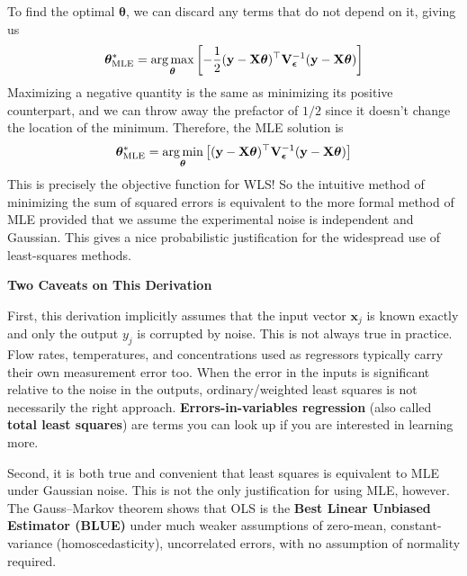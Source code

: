To find the optimal $\boldsymbol{\theta}$, we can discard any terms that do not depend on it, giving us
\begin{equation}
    \boldsymbol{\theta}_{\text{MLE}}^* = \operatorname*{arg\,max}_{\boldsymbol{\theta}} \left[ -\frac{1}{2}(\mathbf{y} - \mathbf{X}\boldsymbol{\theta})^\top \mathbf{V}_{\boldsymbol{\epsilon}}^{-1}(\mathbf{y} - \mathbf{X}\boldsymbol{\theta}) \right]
\end{equation}
Maximizing a negative quantity is the same as minimizing its positive counterpart, and we can throw away the prefactor of $1/2$ since it doesn't change the location of the minimum. Therefore, the MLE solution is
\begin{equation}
    \boldsymbol{\theta}_{\text{MLE}}^* = \operatorname*{arg\,min}_{\boldsymbol{\theta}} \left[ (\mathbf{y} - \mathbf{X}\boldsymbol{\theta})^\top \mathbf{V}_{\boldsymbol{\epsilon}}^{-1}(\mathbf{y} - \mathbf{X}\boldsymbol{\theta}) \right]
\end{equation}
This is precisely the objective function for WLS! So the intuitive method of minimizing the sum of squared errors is equivalent to the more formal method of MLE provided that we assume the experimental noise is independent and Gaussian. This gives a nice probabilistic justification for the widespread use of least-squares methods.

\begin{warningBox}
\textbf{Two Caveats on This Derivation}

First, this derivation implicitly assumes that the input vector $\mathbf{x}_j$ is known exactly and only the output $y_j$ is corrupted by noise. This is not always true in practice. Flow rates, temperatures, and concentrations used as regressors typically carry their own measurement error too. When the error in the inputs is significant relative to the noise in the outputs, ordinary/weighted least squares is not necessarily the right approach. \textbf{Errors-in-variables regression} (also called \textbf{total least squares}) are terms you can look up if you are interested in learning more.

Second, it is both true and convenient that least squares is equivalent to MLE under Gaussian noise. This is not the only justification for using MLE, however. The Gauss--Markov theorem shows that OLS is the \textbf{Best Linear Unbiased Estimator (BLUE)} under much weaker assumptions of zero-mean, constant-variance (homoscedasticity), uncorrelated errors, with no assumption of normality required.
\end{warningBox}

